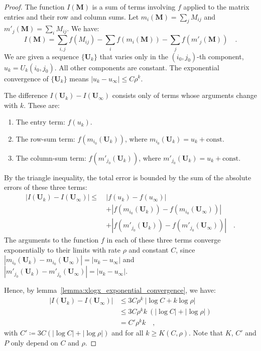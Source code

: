 \documentclass[../../main.tex]{subfiles}
\begin{document}
\begin{proof}
The function $I(\bm{M})$ is a sum of terms involving $f$ applied to the matrix entries and their row and column sums. Let $m_i(\bm{M}) = \sum_j M_{ij}$ and $m'_j(\bm{M}) = \sum_i M_{ij}$. We have:
\[
    I(\bm{M}) = \sum_{i,j} f(M_{ij}) - \sum_i f(m_i(\bm{M})) - \sum_j f(m'_j(\bm{M})) \quad .
\]
We are given a sequence $\{\bm{U}_k\}$ that varies only in the $(i_0, j_0)$-th component, $u_k = U_k(i_0, j_0)$. All other components are constant. The exponential convergence of $\{\bm{U}_k\}$ means $|u_k - u_\infty| \le C \rho^k$.

The difference $I(\bm{U}_k) - I(\bm{U}_\infty)$ consists only of terms whose arguments change with $k$. These are:
\begin{enumerate}
    \item The entry term: $f(u_k)$.
    \item The row-sum term: $f(m_{i_0}(\bm{U}_k))$, where $m_{i_0}(\bm{U}_k) = u_k + \text{const}$.
    \item The column-sum term: $f(m'_{j_0}(\bm{U}_k))$, where $m'_{j_0}(\bm{U}_k) = u_k + \text{const}$.
\end{enumerate}
By the triangle inequality, the total error is bounded by the sum of the absolute errors of these three terms:
\begin{align*}
|I(\bm{U}_k) - I(\bm{U}_\infty)| \le \ & |f(u_k) - f(u_\infty)| \\
& + |f(m_{i_0}(\bm{U}_k)) - f(m_{i_0}(\bm{U}_\infty))| \\
& + |f(m'_{j_0}(\bm{U}_k)) - f(m'_{j_0}(\bm{U}_\infty))| \quad .
\end{align*}
The arguments to the function $f$ in each of these three terms converge exponentially to their limits with rate $\rho$ and constant $C$, since $|m_{i_0}(\bm{U}_k) - m_{i_0}(\bm{U}_\infty)| = |u_k - u_\infty|$ and $|m'_{j_0}(\bm{U}_k) - m'_{j_0}(\bm{U}_\infty)| = |u_k - u_\infty|$.

Hence, by lemma~\ref{lemma:xlogx_exponential_convergence}, we have:
\begin{align*}
|I(\bm{U}_k) - I(\bm{U}_\infty)| &\leq 3 C \rho^k \ |\log C + k \log \rho| \\
&\leq 3 C \rho^k k \ (|\log C| + |\log \rho|) \\
&= C' \rho^k k \quad ,
\end{align*}
with $C' \coloneqq 3 C (|\log C| + |\log \rho|)$ and for all $k \geq K(C, \rho)$. Note that $K$, $C'$ and $P$ only depend on $C$ and $\rho$.
\end{proof}
\end{document}
